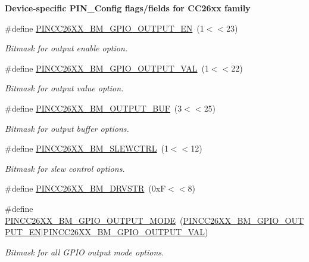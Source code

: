 \begin{Indent}{\bf Device-\/specific P\+I\+N\+\_\+\+Config flags/fields for C\+C26xx family}
\begin{DoxyCompactItemize}
\#define \hyperlink{_p_i_n_c_c26_x_x_8h_a6563826ffb2b58202eb73a66a65300cd}{P\+I\+N\+C\+C26\+X\+X\+\_\+\+B\+M\+\_\+\+G\+P\+I\+O\+\_\+\+O\+U\+T\+P\+U\+T\+\_\+\+E\+N}~(1$<$$<$23)
\begin{DoxyCompactList}\small\item\em Bitmask for output enable option. \end{DoxyCompactList}\item 
\#define \hyperlink{_p_i_n_c_c26_x_x_8h_abf8ccbcf940ccff4ee0b256b536646ea}{P\+I\+N\+C\+C26\+X\+X\+\_\+\+B\+M\+\_\+\+G\+P\+I\+O\+\_\+\+O\+U\+T\+P\+U\+T\+\_\+\+V\+A\+L}~(1$<$$<$22)
\begin{DoxyCompactList}\small\item\em Bitmask for output value option. \end{DoxyCompactList}\item 
\#define \hyperlink{_p_i_n_c_c26_x_x_8h_a15e5f5f426864eecd22dde20df02da4a}{P\+I\+N\+C\+C26\+X\+X\+\_\+\+B\+M\+\_\+\+O\+U\+T\+P\+U\+T\+\_\+\+B\+U\+F}~(3$<$$<$25)
\begin{DoxyCompactList}\small\item\em Bitmask for output buffer options. \end{DoxyCompactList}\item 
\#define \hyperlink{_p_i_n_c_c26_x_x_8h_a84ba4d3153e7ed56d8b5e13a916491dd}{P\+I\+N\+C\+C26\+X\+X\+\_\+\+B\+M\+\_\+\+S\+L\+E\+W\+C\+T\+R\+L}~(1$<$$<$12)
\begin{DoxyCompactList}\small\item\em Bitmask for slew control options. \end{DoxyCompactList}\item 
\#define \hyperlink{_p_i_n_c_c26_x_x_8h_a5454b1e509752bf1630ecb9f8e5ed6c7}{P\+I\+N\+C\+C26\+X\+X\+\_\+\+B\+M\+\_\+\+D\+R\+V\+S\+T\+R}~(0x\+F$<$$<$8)
\item 
\#define \hyperlink{_p_i_n_c_c26_x_x_8h_a66fd916ff55cf49609303cec1c82f2bc}{P\+I\+N\+C\+C26\+X\+X\+\_\+\+B\+M\+\_\+\+G\+P\+I\+O\+\_\+\+O\+U\+T\+P\+U\+T\+\_\+\+M\+O\+D\+E}~(\hyperlink{_p_i_n_c_c26_x_x_8h_a6563826ffb2b58202eb73a66a65300cd}{P\+I\+N\+C\+C26\+X\+X\+\_\+\+B\+M\+\_\+\+G\+P\+I\+O\+\_\+\+O\+U\+T\+P\+U\+T\+\_\+\+E\+N}$\vert$\hyperlink{_p_i_n_c_c26_x_x_8h_abf8ccbcf940ccff4ee0b256b536646ea}{P\+I\+N\+C\+C26\+X\+X\+\_\+\+B\+M\+\_\+\+G\+P\+I\+O\+\_\+\+O\+U\+T\+P\+U\+T\+\_\+\+V\+A\+L})
\begin{DoxyCompactList}\small\item\em Bitmask for all G\+P\+I\+O output mode options. \end{DoxyCompactList}\item 
$$
\end{DoxyCompactItemize}
\end{Indent}
